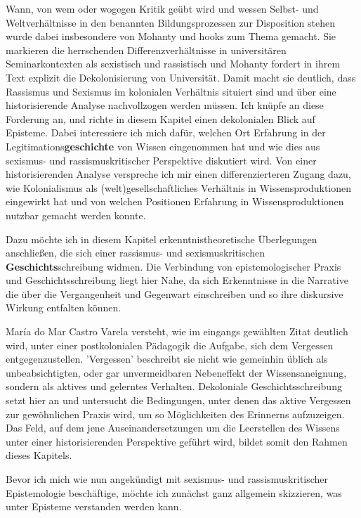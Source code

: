 Wann, von wem oder wogegen Kritik geübt wird und wessen Selbst- und
Weltverhältnisse in den benannten Bildungsprozessen zur Disposition stehen wurde
dabei insbesondere von Mohanty und hooks zum Thema gemacht. Sie markieren die
herrschenden Differenzverhältnisse in universitären Seminarkontexten als
sexistisch und rassistisch und Mohanty fordert in ihrem Text explizit die
Dekolonisierung von Universität. Damit macht sie deutlich, dass Rassismus und
Sexismus im kolonialen Verhältnis situiert sind und über eine historisierende
Analyse nachvollzogen werden müssen. Ich knüpfe an diese Forderung an, und
richte in diesem Kapitel einen dekolonialen Blick auf Episteme. Dabei
interessiere ich mich dafür, welchen Ort Erfahrung in der
Legitimations\textbf{geschichte} von Wissen eingenommen hat und wie dies aus sexismus-
und rassismuskritischer Perspektive diskutiert wird. Von einer historisierenden
Analyse verspreche ich mir einen differenzierteren Zugang dazu, wie
Kolonialismus als (welt)gesellschaftliches Verhältnis in Wissensproduktionen
eingewirkt hat und von welchen Positionen Erfahrung in Wissensproduktionen
nutzbar gemacht werden konnte.

Dazu möchte ich in diesem Kapitel erkenntnistheoretische Überlegungen
anschließen, die sich einer rassismus- und sexismuskritischen
\textbf{Geschichts}schreibung widmen. Die Verbindung von  epistemologischer Praxis und
Geschichtsschreibung liegt hier Nahe, da sich Erkenntnisse in die Narrative die
über die Vergangenheit und Gegenwart einschreiben und so ihre diskursive Wirkung
entfalten können.

María do Mar Castro Varela versteht, wie im eingangs gewählten Zitat deutlich
wird, unter einer postkolonialen Pädagogik die Aufgabe, sich dem Vergessen
entgegenzustellen. 'Vergessen' beschreibt sie nicht wie gemeinhin üblich als
unbeabsichtigten, oder gar unvermeidbaren Nebeneffekt der Wissensaneignung,
sondern als aktives und gelerntes Verhalten. Dekoloniale Geschichtsschreibung
setzt hier an und untersucht die Bedingungen, unter denen das aktive Vergessen
zur gewöhnlichen Praxis wird, um so Möglichkeiten des Erinnerns aufzuzeigen. Das
Feld, auf dem jene Auseinandersetzungen um die Leerstellen des Wissens unter
einer historisierenden Perspektive geführt wird, bildet somit den Rahmen dieses
Kapitels.

Bevor ich mich wie nun angekündigt mit sexismus- und rassismuskritischer
Epistemologie beschäftige, möchte ich zunächst ganz allgemein skizzieren, was
unter Episteme verstanden werden kann.

